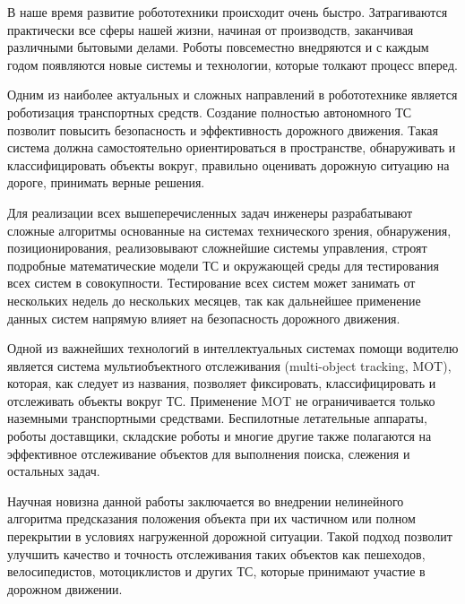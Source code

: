 
В наше время развитие робототехники происходит очень быстро. Затрагиваются практически все сферы нашей жизни, начиная от производств, заканчивая различными бытовыми делами. Роботы повсеместно внедряются и с каждым годом появляются новые системы и технологии, которые толкают процесс вперед.
 
Одним из наиболее актуальных и сложных направлений в робототехнике является роботизация транспортных средств. Создание полностью автономного ТС позволит повысить безопасность и эффективность дорожного движения. Такая система должна самостоятельно ориентироваться в пространстве, обнаруживать и классифицировать объекты вокруг, правильно оценивать дорожную ситуацию на дороге, принимать верные решения.

Для реализации всех вышеперечисленных задач инженеры разрабатывают сложные алгоритмы основанные на системах технического зрения, обнаружения, позиционирования, реализовывают сложнейшие системы управления, строят подробные математические модели ТС и окружающей среды для тестирования всех систем в совокупности. Тестирование всех систем может занимать от нескольких недель до нескольких месяцев, так как дальнейшее применение данных систем напрямую влияет на безопасность дорожного движения.

Одной из важнейших технологий в интеллектуальных системах помощи водителю является система мультиобъектного отслеживания (multi-object tracking, MOT), которая, как следует из названия, позволяет фиксировать, классифицировать и отслеживать объекты вокруг ТС. Применение MOT не ограничивается только наземными транспортными средствами. Беспилотные летательные аппараты, роботы доставщики, складские роботы и многие другие также полагаются на эффективное отслеживание объектов для выполнения поиска, слежения и остальных задач. 

Научная новизна данной работы заключается во внедрении  нелинейного алгоритма предсказания положения объекта при их частичном или полном перекрытии в условиях нагруженной дорожной ситуации. Такой подход позволит улучшить качество и точность отслеживания таких объектов как пешеходов, велосипедистов, мотоциклистов и других ТС, которые принимают участие в дорожном движении. 

